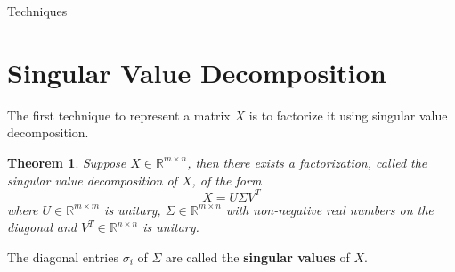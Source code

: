 \documentclass[12pt]{pom_thesis}
\newtheorem{theorem}{Theorem}
\begin{document}
\begin{chapter}{Techniques}
	\label{chapter:techniques}
\section{Singular Value Decomposition}
The first technique to represent a matrix $X$ is to factorize it using singular value decomposition. 

\begin{theorem}
	Suppose  $X \in \mathbb{R}^{m \times n}$, then there exists a factorization, called the singular value decomposition of $X$, of the form 
	$$X= U \Sigma V^T$$ 
	where $U \in \mathbb{R}^{m \times m}$ is unitary, $\Sigma \in \mathbb{R}^{m \times n}$ with non-negative real numbers on the diagonal and $V^T \in \mathbb{R}^{n \times n}$ is unitary. 
\end{theorem}
The diagonal entries $\sigma_i$ of $\Sigma$ are called the \textbf{singular values} of $X$.


\end{chapter}
\end{document}
